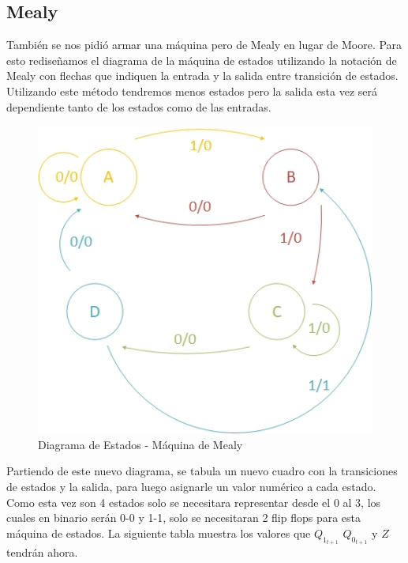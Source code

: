\documentclass[10pt,a4paper]{article}
\begin{document}
\subsection{Mealy}

También se nos pidi\'o armar una m\'aquina pero de Mealy en lugar de Moore. Para esto rediseñamos el diagrama de la máquina de estados utilizando la notaci\'on de Mealy con flechas que indiquen la entrada y la salida entre transición de estados. Utilizando este método tendremos menos estados pero la salida esta vez será dependiente tanto de los estados como de las entradas.

\begin{figure}[H]
	\centering
	\includegraphics[scale=0.6]{Imagenes/diagestmealy.jpg}
	\caption{Diagrama de Estados - Máquina de Mealy}
	\label{2_fig7}
\end{figure}

Partiendo de este nuevo diagrama, se tabula un nuevo cuadro con la transiciones de estados y la salida, para luego asignarle un valor numérico a cada estado. Como esta vez son 4 estados solo se necesitara representar desde el 0 al 3, los cuales en binario serán 0-0 y 1-1, solo se necesitaran 2 flip flops para esta máquina de estados. La siguiente tabla muestra los valores que $Q_{1_{t+1}}$ $Q_{0_{t+1}}$ y $Z$ tendrán ahora.
\end{document}
